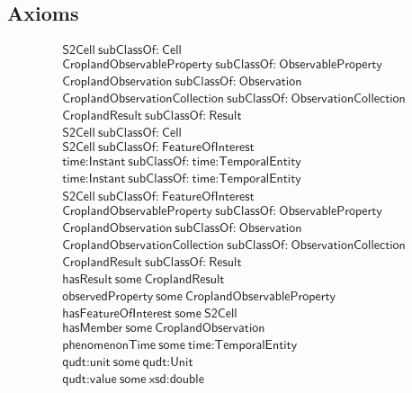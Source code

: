 \subsection{Axioms}
\begin{align}
  \textsf{S2Cell}~\textsf{subClassOf:}~\textsf{Cell}\\
  \textsf{CroplandObservableProperty}~\textsf{subClassOf:}~\textsf{ObservableProperty}\\
  \textsf{CroplandObservation}~\textsf{subClassOf:}~\textsf{Observation}\\
  \textsf{CroplandObservationCollection}~\textsf{subClassOf:}~\textsf{ObservationCollection}\\
  \textsf{CroplandResult}~\textsf{subClassOf:}~\textsf{Result}\\
  \textsf{S2Cell}~\textsf{subClassOf:}~\textsf{Cell}\\
  \textsf{S2Cell}~\textsf{subClassOf:}~\textsf{FeatureOfInterest}\\
  \textsf{time:Instant}~\textsf{subClassOf:}~\textsf{time:TemporalEntity}\\
  \textsf{time:Instant}~\textsf{subClassOf:}~\textsf{time:TemporalEntity}\\
  \textsf{S2Cell}~\textsf{subClassOf:}~\textsf{FeatureOfInterest}\\
  \textsf{CroplandObservableProperty}~\textsf{subClassOf:}~\textsf{ObservableProperty}\\
  \textsf{CroplandObservation}~\textsf{subClassOf:}~\textsf{Observation}\\
  \textsf{CroplandObservationCollection}~\textsf{subClassOf:}~\textsf{ObservationCollection}\\
  \textsf{CroplandResult}~\textsf{subClassOf:}~\textsf{Result}\\
  \textsf{hasResult}~\textsf{some}~\textsf{CroplandResult}\\
  \textsf{observedProperty}~\textsf{some}~\textsf{CroplandObservableProperty}\\
  \textsf{hasFeatureOfInterest}~\textsf{some}~\textsf{S2Cell}\\
  \textsf{hasMember}~\textsf{some}~\textsf{CroplandObservation}\\
  \textsf{phenomenonTime}~\textsf{some}~\textsf{time:TemporalEntity}\\
  \textsf{qudt:unit}~\textsf{some}~\textsf{qudt:Unit}\\
  \textsf{qudt:value}~\textsf{some}~\textsf{xsd:double}\end{align}


